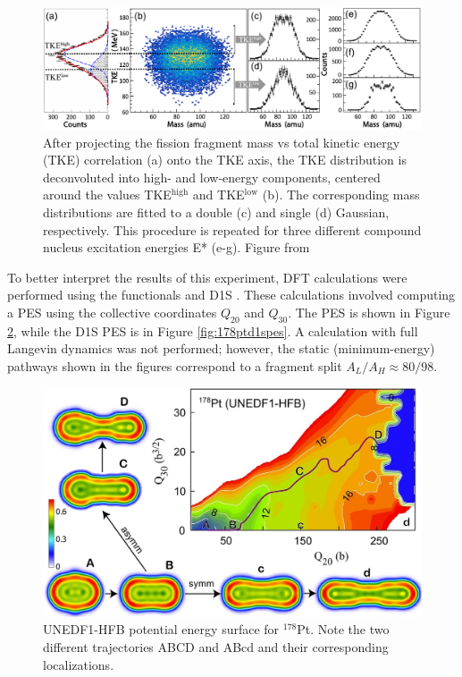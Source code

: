 \begin{figure}
	\centering
	\includegraphics[width=0.95\linewidth]{TeX_files/178Pt_expt_data}
	\caption[$^{178}$Pt experimental data]{After projecting the fission fragment mass vs total kinetic energy (TKE) correlation (a) onto the TKE axis, the TKE distribution is deconvoluted into high- and low-energy components, centered around the values TKE$^\mathrm{high}$ and TKE$^\mathrm{low}$ (b). The corresponding mass distributions are fitted to a double (c) and single (d) Gaussian, respectively. This procedure is repeated for three different compound nucleus excitation energies E* (e-g). Figure from \cite{Tsekhanovich2019}}
	\label{fig:178ptexptdata}
\end{figure}

To better interpret the results of this experiment, DFT calculations were performed using the functionals {\hfb} \cite{Schunck2015} and D1S \cite{Berger1989}. These calculations involved computing a PES using the collective coordinates $Q_{20}$ and $Q_{30}$. The {\hfb} PES is shown in Figure \ref{fig:178ptunedf1pes}, while the D1S PES is in Figure \ref{fig:178ptd1spes}. A calculation with full Langevin dynamics was not performed; however, the static (minimum-energy) pathways shown in the figures correspond to a fragment split $A_L/A_H \approx 80/98$.

\begin{figure}
	\centering
	\includegraphics[width=0.7\linewidth]{TeX_files/178Pt_unedf1_pes.jpg}
	\caption[UNEDF1-HFB potential energy surface for $^{178}$Pt]{UNEDF1-HFB potential energy surface for $^{178}$Pt. Note the two different trajectories ABCD and ABcd and their corresponding localizations.}
	\label{fig:178ptunedf1pes}
\end{figure}

